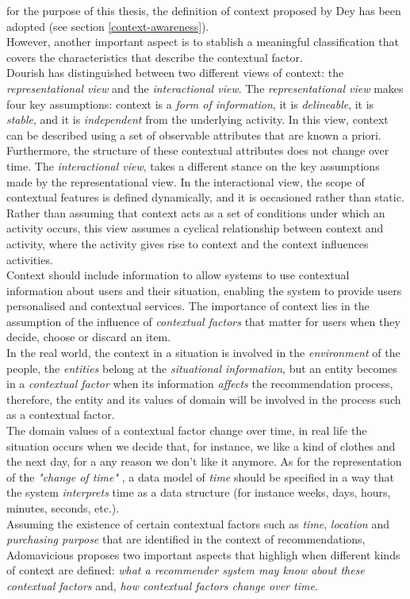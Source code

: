 for the purpose of this thesis, the definition of context
proposed by Dey\cite{dey2001understanding} has been adopted (see section 
\ref{context-awareness}). \\However, another important aspect 
is to stablish a meaningful classification that covers the 
characteristics that describe the contextual factor.\\
Dourish\cite{dourish2004we} has distinguished between two different
views of context: the \textit{representational view} and the
\textit{interactional view}. The \textit{representational view} makes
four key assumptions: context is a \textit{form of information}, it is
\textit{delineable}, it is \textit{stable}, and it is
\textit{independent} from the underlying activity. In this view,
context can be described using a set of observable attributes that are
known a priori. Furthermore, the structure of these contextual
attributes does not change over time. The \textit{interactional view},
takes a different stance on the key assumptions made by the
representational view. In the interactional view, the scope of
contextual features is defined dynamically, and it is occasioned
rather than static. Rather than assuming that context acts as a set of
conditions under which an activity occurs, this view assumes a
cyclical relationship between context and activity, where the activity
gives rise to context and the context influences activities.\\
Context should include information to allow systems to use contextual
information about users and their situation, enabling the system 
to provide users personalised and contextual services. The importance of
context lies in the  assumption of the influence of \textit{contextual
factors} that matter for users when they decide, choose or discard an
item.\\
In the real world, the context in a situation is involved in the
\textit{environment} of the people, the \textit{entities} belong at
the \textit{situational information}, but an entity  becomes in a
\textit{contextual factor} when its information \textit{affects} the
recommendation process, therefore, the entity and its values of 
domain will be involved in the process such as a contextual factor.\\
The domain values of a contextual factor change over time, in
real life the situation occurs when we decide that, for instance,
we like a kind of clothes and the next day, for a any reason we don't
like it anymore. As for the representation of the \textit{"change of time"} , a data 
model of \textit{time} should be specified in a way that the system
\textit{interprets} time as a data structure (for instance weeks, 
days, hours, minutes, seconds, etc.). \\
Assuming the existence of certain contextual factors such as
\textit{time}, \textit{location} and \textit{purchasing purpose} that
are identified in the context of recommendations,
Adomavicious\cite{adomavicius2011context} proposes two important
aspects that highligh when different kinds of context are defined:
\textit{what a recommender system may know about these contextual
factors} and, \textit{how contextual factors change over time}.\\ \\

